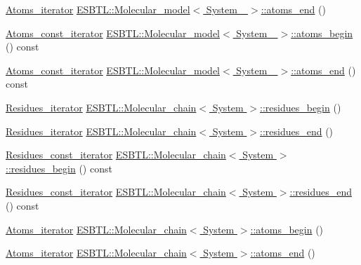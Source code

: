 \begin{DoxyCompactItemize}
\item 
\hyperlink{group__grp__iters_ga458a89ea78f235b807ca0d2dfd9a0427}{Atoms\+\_\+iterator} \hyperlink{group__grp__iters_ga973ddac842fe62aa21ad96eda78dc155}{E\+S\+B\+T\+L\+::\+Molecular\+\_\+model$<$ System\+\_\+ $>$\+::atoms\+\_\+end} ()
\item 
\hyperlink{group__grp__iters_ga41096063f109fca33976a17af4b3a1e4}{Atoms\+\_\+const\+\_\+iterator} \hyperlink{group__grp__iters_ga18c69b2f15720e367ae3d766f3bbe704}{E\+S\+B\+T\+L\+::\+Molecular\+\_\+model$<$ System\+\_\+ $>$\+::atoms\+\_\+begin} () const
\item 
\hyperlink{group__grp__iters_ga41096063f109fca33976a17af4b3a1e4}{Atoms\+\_\+const\+\_\+iterator} \hyperlink{group__grp__iters_ga3c2c120f4056069a1767456fe31de5b5}{E\+S\+B\+T\+L\+::\+Molecular\+\_\+model$<$ System\+\_\+ $>$\+::atoms\+\_\+end} () const
\item 
\hyperlink{group__grp__iters_gaccad04117ad7c730e41bdb9aeab8f116}{Residues\+\_\+iterator} \hyperlink{group__grp__iters_ga5785a87f04fb8ffefaaf46c6f341b05d}{E\+S\+B\+T\+L\+::\+Molecular\+\_\+chain$<$ System $>$\+::residues\+\_\+begin} ()
\item 
\hyperlink{group__grp__iters_gaccad04117ad7c730e41bdb9aeab8f116}{Residues\+\_\+iterator} \hyperlink{group__grp__iters_gaee7c0abec465c6523f3095f2e2f6a8b8}{E\+S\+B\+T\+L\+::\+Molecular\+\_\+chain$<$ System $>$\+::residues\+\_\+end} ()
\item 
\hyperlink{group__grp__iters_ga4cadd9ac293bcd967a86f97bfc626a7f}{Residues\+\_\+const\+\_\+iterator} \hyperlink{group__grp__iters_ga7638b8fd914f2fb1895cfd02c79b1e5d}{E\+S\+B\+T\+L\+::\+Molecular\+\_\+chain$<$ System $>$\+::residues\+\_\+begin} () const
\item 
\hyperlink{group__grp__iters_ga4cadd9ac293bcd967a86f97bfc626a7f}{Residues\+\_\+const\+\_\+iterator} \hyperlink{group__grp__iters_ga074337267e031ed306dfa7048e3bb692}{E\+S\+B\+T\+L\+::\+Molecular\+\_\+chain$<$ System $>$\+::residues\+\_\+end} () const
\item 
\hyperlink{group__grp__iters_gab2ee52ce4f9b656648669214cc44a4ea}{Atoms\+\_\+iterator} \hyperlink{group__grp__iters_gafd79068d582c1a588cf3843fcac1d55d}{E\+S\+B\+T\+L\+::\+Molecular\+\_\+chain$<$ System $>$\+::atoms\+\_\+begin} ()
\item 
\hyperlink{group__grp__iters_gab2ee52ce4f9b656648669214cc44a4ea}{Atoms\+\_\+iterator} \hyperlink{group__grp__iters_gaaacb84783e8dd81f5013c85165b3707b}{E\+S\+B\+T\+L\+::\+Molecular\+\_\+chain$<$ System $>$\+::atoms\+\_\+end} ()
\item 

\end{DoxyCompactItemize}
